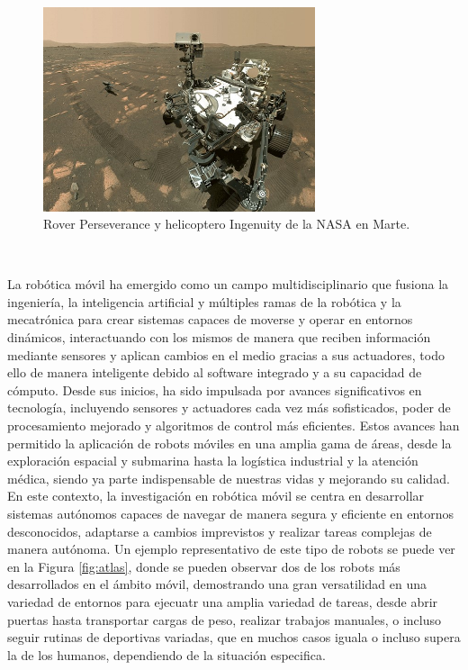 \begin{figure} [h!]
  \begin{center}
    \includegraphics[width=8cm]{figs/perseverance_and_ingenuity_mars_rover_selfie}
  \end{center}
  \caption{Rover Perseverance y helicoptero Ingenuity de la NASA en Marte.}
  \label{fig:rover}
\end{figure}\



La robótica móvil ha emergido como un campo multidisciplinario que fusiona la
ingeniería, la inteligencia artificial y múltiples ramas de la robótica y la
mecatrónica para crear sistemas capaces de moverse y operar en entornos
dinámicos, interactuando con los mismos de manera que reciben información
mediante sensores y aplican cambios en el medio gracias a sus actuadores, todo
ello de manera inteligente debido al software integrado y a su capacidad de
cómputo.
Desde sus inicios, ha sido impulsada por avances significativos en tecnología,
incluyendo sensores y actuadores cada vez más sofisticados, poder de
procesamiento mejorado y algoritmos de control más eficientes.
Estos avances han permitido la aplicación de robots móviles en una amplia gama
de áreas, desde la exploración espacial y submarina hasta la logística
industrial y la atención médica, siendo ya parte indispensable de nuestras vidas
y mejorando su calidad.
En este contexto, la investigación en robótica móvil se centra en desarrollar
sistemas autónomos capaces de navegar de manera segura y eficiente en entornos
desconocidos, adaptarse a cambios imprevistos y realizar tareas complejas de
manera autónoma.
Un ejemplo representativo de este tipo de robots se puede ver en la Figura
\ref{fig:atlas}, donde se pueden observar dos de los robots más desarrollados en
el ámbito móvil, demostrando una gran versatilidad en una variedad de entornos
para ejecuatr una amplia variedad de tareas, desde abrir puertas hasta
transportar cargas de peso, realizar trabajos manuales, o incluso seguir rutinas
de deportivas variadas, que en muchos casos iguala o incluso supera la de los
humanos, dependiendo de la situación especifica.


